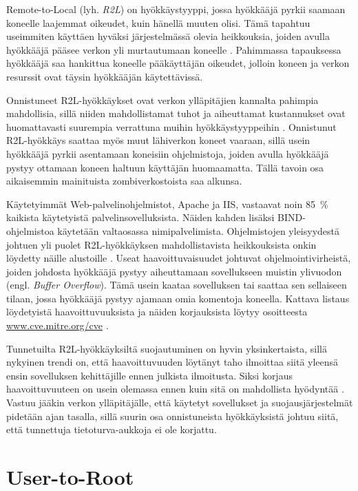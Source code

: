 Remote-to-Local (lyh. \textit{R2L}) on hyökkäystyyppi, jossa hyökkääjä pyrkii
saamaan koneelle laajemmat oikeudet, kuin hänellä muuten
olisi. Tämä tapahtuu useimmiten käyttäen hyväksi järjestelmässä olevia
heikkouksia, joiden avulla hyökkääjä pääsee verkon yli murtautumaan
koneelle \cite{IDS}. Pahimmassa tapauksessa hyökkääjä saa hankittua koneelle
pääkäyttäjän oikeudet, jolloin koneen ja verkon resurssit ovat täysin
hyökkääjän käytettävissä.

Onnistuneet R2L-hyökkäykset ovat verkon ylläpitäjien kannalta pahimpia
mahdollisia, sillä niiden mahdollistamat tuhot ja aiheuttamat kustannukset ovat
huomattavasti suurempia verrattuna muihin hyökkäystyyppeihin \cite{IDSb}. Onnistunut R2L-hyökkäys saattaa
myös muut lähiverkon koneet vaaraan, sillä usein hyökkääjä pyrkii asentamaan
koneisiin ohjelmistoja, joiden avulla hyökkääjä pystyy ottamaan koneen haltuun
käyttäjän huomaamatta. Tällä tavoin osa aikaisemmin mainituista
zombiverkostoista saa alkunsa.

Käytetyimmät Web-palvelinohjelmistot, Apache ja IIS, vastaavat noin 85~\%
kaikista käytetyistä palvelinsovelluksista. Näiden kahden lisäksi
BIND-\-ohjelmistoa käytetään valtaosassa nimipalvelimista. Ohjelmistojen yleisyydestä
johtuen yli puolet R2L-hyökkäyksen mahdollistavista heikkouksista onkin
löydetty näille alustoille \cite{IDS}. Useat haavoittuvaisuudet johtuvat
ohjelmointivirheistä, joiden johdosta hyökkääjä pystyy aiheuttamaan
sovellukseen muistin ylivuodon (engl. \textit{Buffer Overflow}). Tämä usein kaataa
sovelluksen tai saattaa sen sellaiseen tilaan, jossa hyökkääjä pystyy ajamaan
omia komentoja koneella. Kattava listaus löydetyistä haavoittuvuuksista ja näiden
korjauksista löytyy osoitteesta \url{www.cve.mitre.org/cve} \cite{CVE}.

Tunnetuilta R2L-hyökkäyksiltä suojautuminen on hyvin yksinkertaista, sillä
nykyinen trendi on, että haavoittuvuuden löytänyt taho ilmoittaa siitä
yleensä ensin
sovelluksen kehittäjille ennen julkista ilmoitusta. Siksi korjaus
haavoittuvuuteen on usein olemassa ennen kuin sitä on mahdollista hyödyntää \cite{IDSb}.
Vastuu jääkin verkon ylläpitäjälle, että käytetyt sovellukset ja 
suojausjärjestelmät pidetään ajan tasalla, sillä suurin osa onnistuneista hyökkäyksistä 
johtuu siitä, että tunnettuja tietoturva-aukkoja ei ole korjattu.

\section{User-to-Root}

